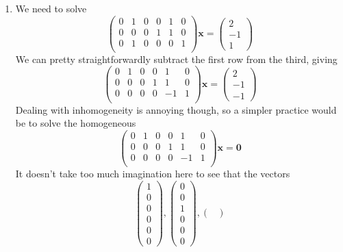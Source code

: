 \documentclass{article}
\newcommand{\chapternumber}{2}
\newenvironment{QandA}{\begin{enumerate}[label=\chapternumber.\arabic*]\bfseries\boldmath}
	{\end{enumerate}}
\newenvironment{answered}{\par\bigskip\normalfont\unboldmath}{}
\begin{document}
\begin{QandA}
		\item
		\begin{answered}
			We need to solve 
			\[\begin{pmatrix}
				0 & 1 & 0 & 0 & 1 & 0 \\
				0 & 0 & 0 & 1 & 1 & 0 \\
				0 & 1 & 0 & 0 & 0 & 1 \\
			\end{pmatrix}
			\textbf{x}
			=
			\begin{pmatrix}
				2\\
				-1\\
				1
			\end{pmatrix}
			\]
			We can pretty straightforwardly subtract the first row from the third, giving
			\[\begin{pmatrix}
				0 & 1 & 0 & 0 & 1 & 0 \\
				0 & 0 & 0 & 1 & 1 & 0 \\
				0 & 0 & 0 & 0 & -1 & 1 \\
			\end{pmatrix}
			\textbf{x}
			=
			\begin{pmatrix}
				2\\
				-1\\
				-1
			\end{pmatrix}
			\]
			Dealing with inhomogeneity is annoying though, so a simpler practice would be to solve the homogeneous
			\[\begin{pmatrix}
				0 & 1 & 0 & 0 & 1 & 0 \\
				0 & 0 & 0 & 1 & 1 & 0 \\
				0 & 0 & 0 & 0 & -1 & 1 \\
			\end{pmatrix}
			\textbf{x}
			=
			\textbf{0}\]
			It doesn't take too much imagination here to see that the vectors
			\[\begin{pmatrix}
				1 \\ 0 \\ 0 \\ 0 \\ 0 \\ 0
			\end{pmatrix},
			\begin{pmatrix}
				0 \\ 0 \\ 1 \\ 0 \\ 0 \\ 0
			\end{pmatrix},
			\begin{pmatrix}

\end{pmatrix}\]
\end{answered}
\end{QandA}
\end{document}
